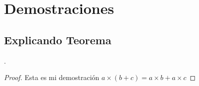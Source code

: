 \chapter{Demostraciones}

\section{Explicando Teorema}
\lipsum[1-2].

\begin{proof} 
  Esta es mi demostración $a \times (b+c)=a \times b + a \times c$ 
\end{proof}
